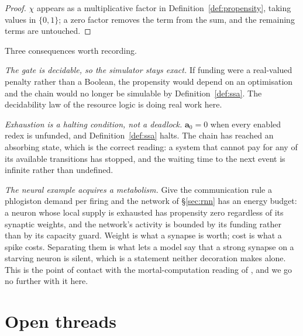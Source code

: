 \documentclass[11pt,a4paper]{article}
\theoremstyle{plain}
\theoremstyle{definition}
\theoremstyle{remark}
\newcommand{\prop}{\mathbf{a}}
\begin{document}
\begin{proof}
$\chi$ appears as a multiplicative factor in Definition~\ref{def:propensity}, taking values in
$\{0,1\}$; a zero factor removes the term from the sum, and the remaining terms are untouched.
\end{proof}

Three consequences worth recording.

\emph{The gate is decidable, so the simulator stays exact.} If funding were a real-valued penalty
rather than a Boolean, the propensity would depend on an optimisation and the chain would no longer
be simulable by Definition~\ref{def:ssa}. The decidability law of the resource logic is doing real
work here.

\emph{Exhaustion is a halting condition, not a deadlock.} $\prop_0 = 0$ when every enabled redex is
unfunded, and Definition~\ref{def:ssa} halts. The chain has reached an absorbing state, which is the
correct reading: a system that cannot pay for any of its available transitions has stopped, and the
waiting time to the next event is infinite rather than undefined.

\emph{The neural example acquires a metabolism.} Give the communication rule a phlogiston demand per
firing and the network of \S\ref{sec:rnn} has an energy budget: a neuron whose local supply is
exhausted has propensity zero regardless of its synaptic weights, and the network's activity is
bounded by its funding rather than by its capacity guard. Weight is what a synapse is worth; cost is
what a spike costs. Separating them is what lets a model say that a strong synapse on a starving
neuron is silent, which is a statement neither decoration makes alone. This is the point of contact
with the mortal-computation reading of \cite{scientist}, and we go no further with it here.

\section{Open threads}
\label{sec:open}
\end{document}
